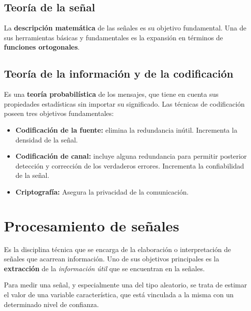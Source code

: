 \documentclass[10pt,a4paper]{book}
\begin{document}
\subsection{Teoría de la señal}
La \textbf{descripción matemática} de las señales es su objetivo fundamental. Una de sus herramientas básicas y fundamentales es la expansión en términos de \textbf{funciones ortogonales}.

\subsection{Teoría de la información y de la codificación}
Es una \textbf{teoría probabilística} de los mensajes, que tiene en cuenta sus propiedades estadísticas sin importar su significado. Las técnicas de codificación poseen tres objetivos fundamentales:
\begin{itemize}
\item \textbf{Codificación de la fuente:} elimina la redundancia inútil. Incrementa la densidad de la señal. 
\item \textbf{Codificación de canal:} incluye alguna redundancia para permitir posterior detección y corrección de los verdaderos errores. Incrementa la confiabilidad de la señal. 
\item \textbf{Criptografía:} Asegura la privacidad de la comunicación. 
\end{itemize}

\section{Procesamiento de señales}
Es la disciplina técnica que se encarga de la elaboración o interpretación de señales que acarrean información. Uno de sus objetivos principales es la \textbf{extracción} de la \textit{información útil} que se encuentran en la señales.

Para medir una señal, y especialmente una del tipo aleatorio, se trata de estimar el valor de una variable característica, que está vinculada a la misma con un determinado nivel de confianza.
\end{document}
